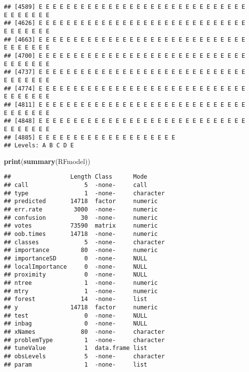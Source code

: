 \documentclass[]{article}
\newenvironment{Shaded}{\begin{snugshade}}{\end{snugshade}}
\newcommand{\KeywordTok}[1]{\textcolor[rgb]{0.13,0.29,0.53}{\textbf{#1}}}
\newcommand{\NormalTok}[1]{#1}
\begin{document}
\begin{verbatim}
## [4589] E E E E E E E E E E E E E E E E E E E E E E E E E E E E E E E E E E E E E
## [4626] E E E E E E E E E E E E E E E E E E E E E E E E E E E E E E E E E E E E E
## [4663] E E E E E E E E E E E E E E E E E E E E E E E E E E E E E E E E E E E E E
## [4700] E E E E E E E E E E E E E E E E E E E E E E E E E E E E E E E E E E E E E
## [4737] E E E E E E E E E E E E E E E E E E E E E E E E E E E E E E E E E E E E E
## [4774] E E E E E E E E E E E E E E E E E E E E E E E E E E E E E E E E E E E E E
## [4811] E E E E E E E E E E E E E E E E E E E E E E E E E E E E E E E E E E E E E
## [4848] E E E E E E E E E E E E E E E E E E E E E E E E E E E E E E E E E E E E E
## [4885] E E E E E E E E E E E E E E E E E E E E
## Levels: A B C D E
\end{verbatim}

\begin{Shaded}
\begin{Highlighting}[]
\KeywordTok{print}\NormalTok{(}\KeywordTok{summary}\NormalTok{(RFmodel))}
\end{Highlighting}
\end{Shaded}

\begin{verbatim}
##                 Length Class      Mode     
## call                5  -none-     call     
## type                1  -none-     character
## predicted       14718  factor     numeric  
## err.rate         3000  -none-     numeric  
## confusion          30  -none-     numeric  
## votes           73590  matrix     numeric  
## oob.times       14718  -none-     numeric  
## classes             5  -none-     character
## importance         80  -none-     numeric  
## importanceSD        0  -none-     NULL     
## localImportance     0  -none-     NULL     
## proximity           0  -none-     NULL     
## ntree               1  -none-     numeric  
## mtry                1  -none-     numeric  
## forest             14  -none-     list     
## y               14718  factor     numeric  
## test                0  -none-     NULL     
## inbag               0  -none-     NULL     
## xNames             80  -none-     character
## problemType         1  -none-     character
## tuneValue           1  data.frame list     
## obsLevels           5  -none-     character
## param               1  -none-     list
\end{verbatim}
\end{document}
